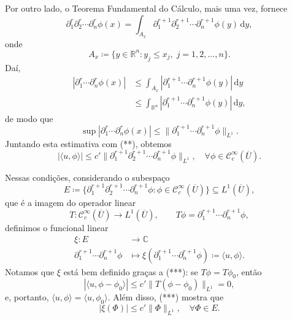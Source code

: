 \documentclass[../distribution_theory_notes.tex]{subfiles}
\begin{document}
Por outro lado, o Teorema Fundamental do Cálculo, mais uma vez, fornece
\[
	\partial_{1}^{r}\partial_{2}^{r}\cdots \partial_{n}^{r}\phi (x)
	=\int_{A_{x}}^{}
	\partial_{1}^{r+1}\partial_{2}^{r+1}\cdots \partial_{n}^{r+1}\phi (y)\,\mathrm{d}y,
\]
onde
\[
	A_{x}\coloneqq \{y\in \mathbb{R}^{n}:y_{j}\leq x_{j},\; j=1,2,\dotsc ,n\}.
\]
Daí,
\begin{align*}
	| \partial_{1}^{r}\cdots \partial_{n}^{r}\phi (x) |
	 & \leq \int_{A_{x}}^{}| \partial_{1}^{r+1}\cdots \partial_{n}^{r+1}\phi (y) |\,\mathrm{d}y           \\
	 & \leq \int_{\mathbb{R}^{n}}^{}| \partial_{1}^{r+1}\cdots \partial_{n}^{r+1}\phi (y) |\,\mathrm{d}y,
\end{align*}
de modo que
\[
	\sup | \partial_{1}^{r}\cdots \partial_{n}^{r}\phi (x) |
	\leq \| \partial_{1}^{r+1}\cdots \partial_{n}^{r+1}\phi \|_{L^{1}}.
\]
Juntando esta estimativa com (**), obtemos
\[
	| \langle u, \phi  \rangle |
	\leq c'\| \partial_{1}^{r+1}\partial_{2}^{r+1}\cdots \partial_{n}^{r+1}\phi \|_{L^{1}},
	\quad \forall \phi \in \mathcal{C}_{c}^{\infty}(\overline{U}). \tag{***}
\]

Nessas condições, considerando o subespaço
\[
	E\coloneqq \{\partial_{1}^{r+1}\partial_{2}^{r+1}\cdots \partial_{n}^{r+1}\phi :\phi \in \mathcal{C}_{c}^{\infty}(\overline{U})\}
	\subseteq L^{1}(\overline{U}),
\]
que é a imagem do operador linear
\[
	T:\mathcal{C}_{c}^{\infty}(\overline{U})\rightarrow L^{1}(\overline{U}),
	\qquad T\phi =\partial_{1}^{r+1}\cdots \partial_{n}^{r+1}\phi,
\]
definimos o funcional linear
\begin{align*}
	\xi:E & \rightarrow \mathbb{C}                                           \\
	\partial_{1}^{r+1}\cdots \partial_{n}^{r+1}\phi
	      & \longmapsto \xi(\partial_{1}^{r+1}\cdots \partial_{n}^{r+1}\phi)
	\coloneqq \langle u, \phi  \rangle.
\end{align*}
Notamos que \(\xi \) está bem definido graças a (***): se \(T\phi =T\phi_{0}\), então
\[
	| \langle u, \phi -\phi_{0} \rangle |
	\leq c'\|T(\phi -\phi_{0})\|_{L^{1}}=0,
\]
e, portanto, \(\langle u, \phi  \rangle=\langle u, \phi_{0} \rangle\). Além disso, (***) mostra que
\[
	| \xi(\Phi ) |\leq c'\| \Phi \|_{L^{1}},
	\quad \forall \Phi \in E.
\]
\end{document}
